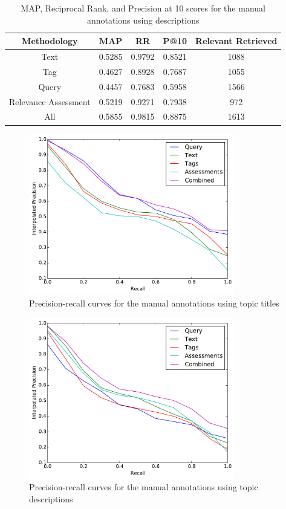 \begin{table}[ht]
    \centering
    \begin{tabular}{|c|c|c|c|c|}
        \hline
         Methodology & MAP & RR & P@10 & Relevant Retrieved \\ \hline
         Text & 0.5285 & 0.9792 & 0.8521 & 1088 \\ \hline
         Tag & 0.4627 & 0.8928 & 0.7687 & 1055 \\ \hline
         Query & 0.4457 & 0.7683 & 0.5958 & 1566 \\ \hline
         Relevance Assessment & 0.5219 & 0.9271 & 0.7938 & 972 \\ \hline
         All & 0.5855 & 0.9815 & 0.8875 & 1613 \\ \hline
    \end{tabular}
    \caption{MAP, Reciprocal Rank, and Precision at 10 scores for the manual annotations using descriptions}
    \label{table:manual-results-title}
\end{table}

\begin{figure}[ht]
    \centering
    \includegraphics[width=0.8\textwidth]{graphs/manual-title}
    \caption{Precision-recall curves for the manual annotations using topic titles}
    \label{fig:manual-result-title}
\end{figure}

\begin{figure}[ht]
    \centering
    \includegraphics[width=0.8\textwidth]{graphs/manual-desc}
    \caption{Precision-recall curves for the manual annotations using topic descriptions}
    \label{fig:manual-result-desc}
\end{figure}

